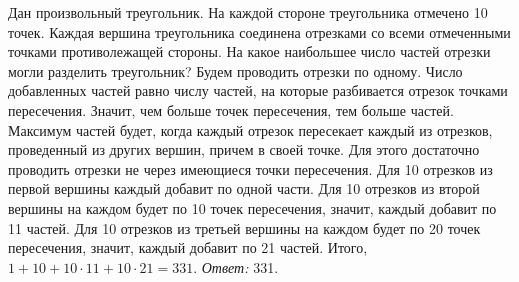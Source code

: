 \problem
Дан произвольный треугольник.
На каждой стороне треугольника отмечено 10 точек.
Каждая вершина треугольника соединена отрезками со всеми отмеченными точками
противолежащей стороны.
На какое наибольшее число частей отрезки могли разделить треугольник?
\solution
Будем проводить отрезки по одному.
Число добавленных частей равно числу частей, на которые разбивается отрезок
точками пересечения.
Значит, чем больше точек пересечения, тем больше частей.
Максимум частей будет, когда каждый отрезок пересекает каждый из отрезков,
проведенный из других вершин, причем в своей точке.
Для этого достаточно проводить отрезки не через имеющиеся точки пересечения.
Для 10 отрезков из первой вершины каждый добавит по одной части.
Для 10 отрезков из второй вершины на каждом будет по 10 точек пересечения,
значит, каждый добавит по 11 частей.
Для 10 отрезков из третьей вершины на каждом будет по 20 точек пересечения,
значит, каждый добавит по 21 частей.
Итого, $1 + 10 + 10 \cdot 11 + 10 \cdot 21 = 331$.
\emph{Ответ:} 331.
\endproblem
